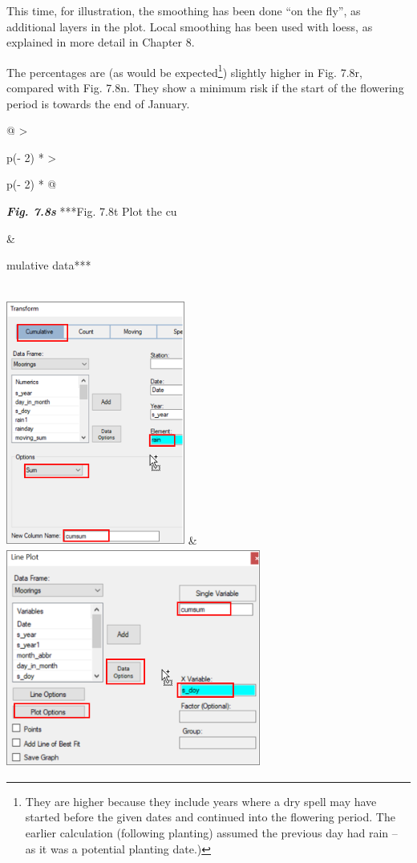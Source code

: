 \documentclass[
  letterpaper,
  DIV=11,
  numbers=noendperiod]{scrreprt}
\begin{document}
This time, for illustration, the smoothing has been done ``on the fly'',
as additional layers in the plot. Local smoothing has been used with
loess, as explained in more detail in Chapter 8.

The percentages are (as would be expected\footnote{They are higher
  because they include years where a dry spell may have started before
  the given dates and continued into the flowering period. The earlier
  calculation (following planting) assumed the previous day had rain --
  as it was a potential planting date.)}) slightly higher in Fig. 7.8r,
compared with Fig. 7.8n. They show a minimum risk if the start of the
flowering period is towards the end of January.

\begin{longtable}[]{@{}
  >{\raggedright\arraybackslash}p{(\columnwidth - 2\tabcolsep) * }
  >{\raggedright\arraybackslash}p{(\columnwidth - 2\tabcolsep) * }@{}}
\toprule\noalign{}
\begin{minipage}[b]{\linewidth}\raggedright
\textbf{\emph{Fig. 7.8s}} ***Fig. 7.8t Plot the cu
\end{minipage} & \begin{minipage}[b]{\linewidth}\raggedright
mulative data***
\end{minipage} \\
\midrule\noalign{}
\endhead
\bottomrule\noalign{}
\endlastfoot
\includegraphics[width=2.31262in,height=3.17377in]{figures/Fig7.8s.png}
&
\includegraphics[width=3.28926in,height=2.83853in]{figures/Fig7.8t.png} \\
\end{longtable}
\end{document}
